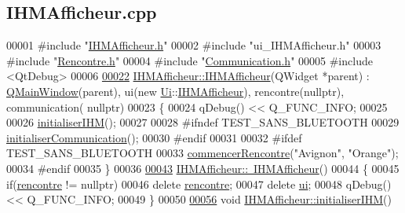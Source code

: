 \hypertarget{_i_h_m_afficheur_8cpp_source}{}\subsection{I\+H\+M\+Afficheur.\+cpp}

\begin{DoxyCode}
00001 \textcolor{preprocessor}{#include "\hyperlink{_i_h_m_afficheur_8h}{IHMAfficheur.h}"}
00002 \textcolor{preprocessor}{#include "ui\_IHMAfficheur.h"}
00003 \textcolor{preprocessor}{#include "\hyperlink{_rencontre_8h}{Rencontre.h}"}
00004 \textcolor{preprocessor}{#include "\hyperlink{_communication_8h}{Communication.h}"}
00005 \textcolor{preprocessor}{#include <QtDebug>}
00006 
\hyperlink{class_i_h_m_afficheur_a2fdf6626a1d9c2c635110a6e6ab703f9}{00022} \hyperlink{class_i_h_m_afficheur_a2fdf6626a1d9c2c635110a6e6ab703f9}{IHMAfficheur::IHMAfficheur}(QWidget *parent) : 
      \hyperlink{class_q_main_window}{QMainWindow}(parent), ui(new \hyperlink{namespace_ui}{Ui}::\hyperlink{class_i_h_m_afficheur}{IHMAfficheur}), rencontre(nullptr), communication(
      nullptr)
00023 \{
00024     qDebug() << Q\_FUNC\_INFO;
00025 
00026     \hyperlink{class_i_h_m_afficheur_a119539fa51bf2e091e77faedf82eb146}{initialiserIHM}();
00027 
00028 \textcolor{preprocessor}{    #ifndef TEST\_SANS\_BLUETOOTH}
00029     \hyperlink{class_i_h_m_afficheur_ab7a8db8e7cfa6dc86ab59a07ede75298}{initialiserCommunication}();
00030 \textcolor{preprocessor}{    #endif}
00031 
00032 \textcolor{preprocessor}{    #ifdef TEST\_SANS\_BLUETOOTH}
00033     \hyperlink{class_i_h_m_afficheur_ad2dc0742d9cdda731a16c570fd6f2434}{commencerRencontre}(\textcolor{stringliteral}{"Avignon"}, \textcolor{stringliteral}{"Orange"});
00034 \textcolor{preprocessor}{    #endif}
00035 \}
00036 
\hyperlink{class_i_h_m_afficheur_aba47ddf68f3966ed8f5c697b48e352a4}{00043} \hyperlink{class_i_h_m_afficheur_aba47ddf68f3966ed8f5c697b48e352a4}{IHMAfficheur::~IHMAfficheur}()
00044 \{
00045     \textcolor{keywordflow}{if}(\hyperlink{class_i_h_m_afficheur_aef34d340f7ea30f049a98efc47bd9779}{rencontre} != \textcolor{keyword}{nullptr})
00046         \textcolor{keyword}{delete} \hyperlink{class_i_h_m_afficheur_aef34d340f7ea30f049a98efc47bd9779}{rencontre};
00047     \textcolor{keyword}{delete} \hyperlink{class_i_h_m_afficheur_a26ca43f1ff87b1caa2191adcce444d23}{ui};
00048     qDebug() << Q\_FUNC\_INFO;
00049 \}
00050 
\hyperlink{class_i_h_m_afficheur_a119539fa51bf2e091e77faedf82eb146}{00056} \textcolor{keywordtype}{void} \hyperlink{class_i_h_m_afficheur_a119539fa51bf2e091e77faedf82eb146}{IHMAfficheur::initialiserIHM}()

\end{DoxyCode}
